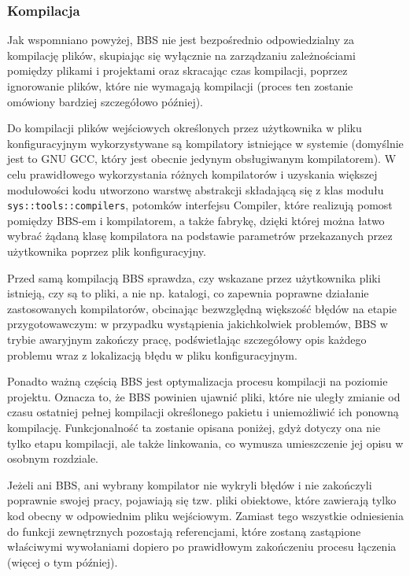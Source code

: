 \subsubsection{Kompilacja}
Jak wspomniano powyżej, BBS nie jest bezpośrednio odpowiedzialny za kompilację plików, skupiając się wyłącznie na zarządzaniu zależnościami pomiędzy plikami i projektami oraz skracając czas kompilacji, poprzez ignorowanie plików, które nie wymagają kompilacji (proces ten zostanie omówiony bardziej szczegółowo później).

Do kompilacji plików wejściowych określonych przez użytkownika w pliku konfiguracyjnym wykorzystywane są kompilatory istniejące w systemie (domyślnie jest to GNU GCC, który jest obecnie jedynym obsługiwanym kompilatorem). W celu prawidłowego wykorzystania różnych kompilatorów i uzyskania większej modułowości kodu utworzono warstwę abstrakcji składającą się z klas modułu \texttt{sys::tools::compilers}, potomków interfejsu Compiler, które realizują pomost pomiędzy BBS-em i kompilatorem, a także fabrykę, dzięki której można łatwo wybrać żądaną klasę kompilatora na podstawie parametrów przekazanych przez użytkownika poprzez plik konfiguracyjny.

Przed samą kompilacją BBS sprawdza, czy wskazane przez użytkownika pliki istnieją, czy są to pliki, a nie np. katalogi, co zapewnia poprawne działanie zastosowanych kompilatorów, obcinając bezwzględną większość błędów na etapie przygotowawczym: w przypadku wystąpienia jakichkolwiek problemów, BBS w trybie awaryjnym zakończy pracę, podświetlając szczegółowy opis każdego problemu wraz z lokalizacją błędu w pliku konfiguracyjnym.

Ponadto ważną częścią BBS jest optymalizacja procesu kompilacji na poziomie projektu. Oznacza to, że BBS powinien ujawnić pliki, które nie uległy zmianie od czasu ostatniej pełnej kompilacji określonego pakietu i uniemożliwić ich ponowną kompilację. Funkcjonalność ta zostanie opisana poniżej, gdyż dotyczy ona nie tylko etapu kompilacji, ale także linkowania, co wymusza umieszczenie jej opisu w osobnym rozdziale.

Jeżeli ani BBS, ani wybrany kompilator nie wykryli błędów i nie zakończyli poprawnie swojej pracy, pojawiają się tzw. pliki obiektowe, które zawierają tylko kod obecny w odpowiednim pliku wejściowym. Zamiast tego wszystkie odniesienia do funkcji zewnętrznych pozostają referencjami, które zostaną zastąpione właściwymi wywołaniami dopiero po prawidłowym zakończeniu procesu łączenia (więcej o tym później).

